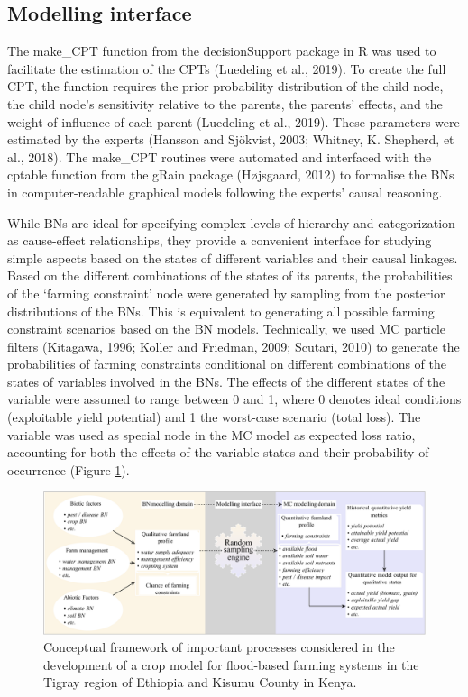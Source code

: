 \documentclass[]{elsarticle} %
\begin{document}
\hypertarget{ref35}{%
\subsection{Modelling interface}\label{ref35}}

The make\_CPT function from the decisionSupport package in R was used to facilitate the estimation of the CPTs (Luedeling et al., 2019). To create the full CPT, the function requires the prior probability distribution of the child node, the child node's sensitivity relative to the parents, the parents' effects, and the weight of influence of each parent (Luedeling et al., 2019). These parameters were estimated by the experts (Hansson and Sjökvist, 2003; Whitney, K. Shepherd, et al., 2018). The make\_CPT routines were automated and interfaced with the cptable function from the gRain package (Højsgaard, 2012) to formalise the BNs in computer-readable graphical models following the experts' causal reasoning.

While BNs are ideal for specifying complex levels of hierarchy and categorization as cause-effect relationships, they provide a convenient interface for studying simple aspects based on the states of different variables and their causal linkages. Based on the different combinations of the states of its parents, the probabilities of the `farming constraint' node were generated by sampling from the posterior distributions of the BNs. This is equivalent to generating all possible farming constraint scenarios based on the BN models. Technically, we used MC particle filters (Kitagawa, 1996; Koller and Friedman, 2009; Scutari, 2010) to generate the probabilities of farming constraints conditional on different combinations of the states of variables involved in the BNs. The effects of the different states of the variable were assumed to range between 0 and 1, where 0 denotes ideal conditions (exploitable yield potential) and 1 the worst-case scenario (total loss). The variable was used as special node in the MC model as expected loss ratio, accounting for both the effects of the variable states and their probability of occurrence (Figure \ref{fig:fig3}).

\begin{figure}[!h]

{\centering \includegraphics[width=1\linewidth,]{figures/fig3-plot-1} 

}

\caption{Conceptual framework of important processes considered in the development of a crop model for flood-based farming systems in the Tigray region of Ethiopia and Kisumu County in Kenya.}\label{fig:fig3}
\end{figure}
\end{document}
